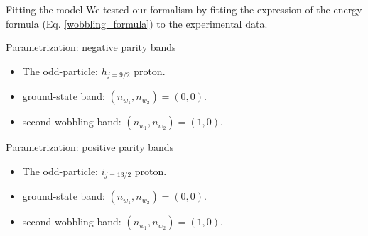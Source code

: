 \documentclass{beamer}
\begin{document}
\begin{frame}{Fitting the model}
    We tested our formalism by fitting the expression of the energy formula (Eq. \ref{wobbling_formula}) to the experimental data.
    \begin{block}{Parametrization: negative parity bands}
    \begin{itemize}
    \item The odd-particle: $h_{j=9/2}$ proton.
    \item ground-state band: $(n_{w_1},n_{w_2})=(0,0)$.
    \item second wobbling band: $(n_{w_1},n_{w_2})=(1,0)$.
    \end{itemize}
    \end{block}
    \begin{block}{Parametrization: positive parity bands}
    \begin{itemize}
    \item The odd-particle: $i_{j=13/2}$ proton.
    \item ground-state band: $(n_{w_1},n_{w_2})=(0,0)$.
    \item second wobbling band: $(n_{w_1},n_{w_2})=(1,0)$.
    \end{itemize}
    \end{block}
\end{frame}
\end{document}
